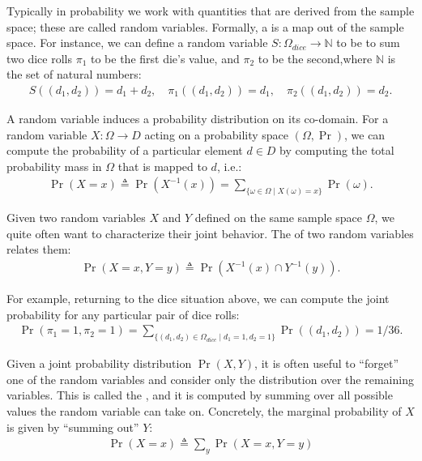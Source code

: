 \documentclass{tufte-handout}
\begin{document}
Typically in probability we work with quantities that are derived from the sample space; 
these are called random variables.
Formally, a  is a map out of the sample space. For instance, we can
define a random variable $S : \Omega_{dice} \rightarrow \mathbb{N}$ to be to sum two dice rolls
$\pi_1$ to be the first die's value, and $\pi_2$ to be the second,where
$\mathbb{N}$ is the set of natural numbers:
\begin{align}
    S((d_1, d_2)) = d_1 + d_2, \quad \pi_1((d_1, d_2)) = d_1, \quad \pi_2((d_1, d_2)) = d_2.
    \label{eq:rvs}
\end{align}

A random variable induces a probability distribution on its co-domain. For a
random variable $X : \Omega \rightarrow D$ acting on a probability space
$(\Omega, \Pr)$, we can compute the probability of a particular element $d \in
D$ by computing the total probability mass in $\Omega$ that is mapped to $d$,
i.e.:
\begin{align}
    \Pr(X = x) \triangleq \Pr(X^{-1}(x)) = \sum_{\{\omega \in \Omega \mid X(\omega) = x\}} \Pr(\omega).
\end{align}

Given two random variables $X$ and $Y$ defined on the same sample space
$\Omega$, we quite often want to characterize their joint behavior. The 
 of two random variables relates them:
\begin{align}
    \Pr(X=x, Y=y) \triangleq \Pr(X^{-1}(x) \cap Y^{-1}(y)).
\end{align}


For example, returning to the dice situation above, we can compute the 
joint probability for any particular pair of dice rolls:
\begin{align*}
    \Pr(\pi_1 = 1, \pi_2 = 1) = \sum_{\{(d_1, d_2) \in \Omega_{dice} \mid d_1 = 1, d_2 = 1 \}} \Pr((d_1, d_2)) = 1/36.
\end{align*}

Given a joint probability distribution $\Pr(X, Y)$, it is often useful to ``forget'' 
one of the random variables and consider only the distribution over the remaining 
variables. This is called the , and it is computed by summing 
over all possible values the random variable can take on. Concretely, the
marginal probability of $X$ is given by ``summing out'' $Y$:
\begin{align}
    \Pr(X = x) \triangleq \sum_{y} \Pr(X=x, Y=y)
    \label{eq:marg}
\end{align}
\end{document}
